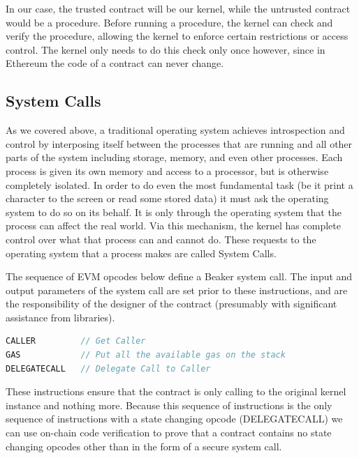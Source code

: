 \documentclass[english,a4paper]{article}
\begin{document}
In our case, the trusted contract will be our kernel, while the
untrusted contract would be a procedure. Before running a procedure, the
kernel can check and verify the procedure, allowing the kernel to
enforce certain restrictions or access control. The kernel only needs to
do this check only once however, since in Ethereum the code of a
contract can never change.

\subsection{System Calls}\label{system-calls}
As we covered above, a traditional operating system achieves
introspection and control by interposing itself between the processes
that are running and all other parts of the system including storage,
memory, and even other processes. Each process is given its own memory
and access to a processor, but is otherwise completely isolated. In
order to do even the most fundamental task (be it print a character to
the screen or read some stored data) it must ask the operating system to
do so on its behalf. It is only through the operating system that the
process can affect the real world. Via this mechanism, the kernel has
complete control over what that process can and cannot do. These
requests to the operating system that a process makes are called System
Calls.

The sequence of EVM opcodes below define a Beaker system call. The input
and output parameters of the system call are set prior to these
instructions, and are the responsibility of the designer of the contract
(presumably with significant assistance from libraries).




\begin{minipage}{\linewidth}
\begin{lstlisting}[language=c,commentstyle=\color{mygreen},basicstyle=\ttfamily,identifierstyle=\color{blue},caption=Sequence of steps to perform a system call.]
CALLER         // Get Caller
GAS            // Put all the available gas on the stack
DELEGATECALL   // Delegate Call to Caller
\end{lstlisting}
\end{minipage}

These instructions ensure that the contract is only calling to the
original kernel instance and nothing more. Because this sequence of
instructions is the only sequence of instructions with a state changing
opcode (DELEGATECALL) we can use on-chain code verification to prove
that a contract contains no state changing opcodes other than in the
form of a secure system call.
\end{document}
